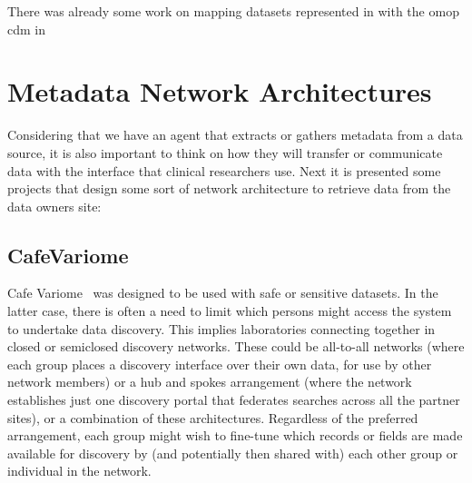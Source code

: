 There was already some work on mapping datasets represented in with the \gls{omop} \gls{cdm} in \cite{cdm-dats}


\section{Metadata Network Architectures}  %

Considering that we have an agent that extracts or gathers metadata from a data source,
it is also important to think on how they will transfer or communicate data with the
interface that clinical researchers use.
Next it is presented some projects that design some sort of network architecture to
retrieve data from the data owners site:


\subsection*{CafeVariome}
Cafe Variome~\cite{cafevariome} was designed to be used with safe or sensitive datasets.
In the latter case, there is often a need to limit which persons might access the system to undertake data discovery.
This implies laboratories connecting together in closed or semiclosed discovery networks.
These could be all-to-all networks (where each group places a discovery interface over their own data, for use by other network members) or a hub and spokes arrangement (where the network establishes just one discovery portal that federates searches across all the partner sites), or a combination of these architectures.
Regardless of the preferred arrangement, each group might wish to fine-tune which records or fields are made available for discovery by (and potentially then shared with) each other group or individual in the network.

